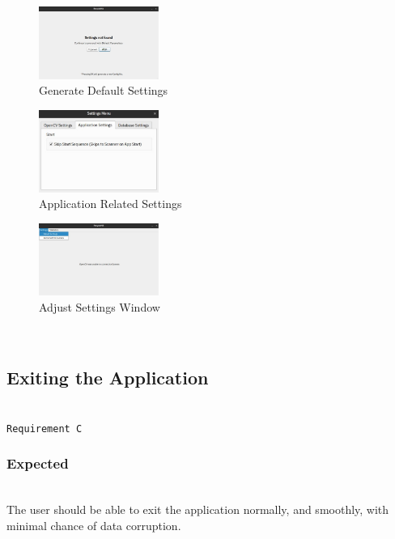 \documentclass[conference]{IEEEtran}
\begin{document}
\begin{figure}[h]
    \centering
    \includegraphics[width=0.35\textwidth]{images/settings_alert.eps}
    \caption{Generate Default Settings}
\end{figure}

\begin{figure}[h]
    \centering
    \includegraphics[width=0.35\textwidth]{images/app_settings.eps}
    \caption{Application Related Settings}
\end{figure}

\begin{figure}[h]
    \centering
    \includegraphics[width=0.35\textwidth]{images/adjust_settings.eps}
    \caption{Adjust Settings Window}
\end{figure}~\\

\newpage
\subsection{Exiting the Application}~\\
\texttt{Requirement C}~\\
\subsubsection{Expected}~\\
The user should be able to exit the application normally, and smoothly, with minimal chance of data corruption.~\\
\end{document}

